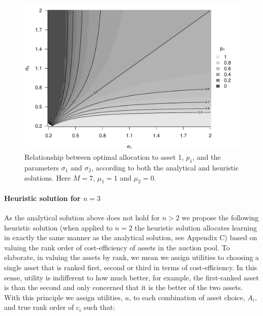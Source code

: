 \documentclass[]{article}
\theoremstyle{definition}
\theoremstyle{definition}
\theoremstyle{remark}
\begin{document}
\begin{figure}[htbp]
\centering
\includegraphics{voiConsAuc_files/figure-latex/evsi2anplot2-1.pdf}
\caption{\label{fig:evsi2anplot2}Relationship between optimal allocation to asset 1,
\(p_1\), and the parameters \(\sigma_1\) and \(\sigma_2\), according to
both the analytical and heuristic solutions. Here \(M=7\), \(\mu_1=1\)
and \(\mu_2=0\).}
\end{figure}

\clearpage

\paragraph*{\texorpdfstring{Heuristic solution for
\(n = 3\)}{Heuristic solution for n = 3}}\label{heuristic-solution-for-n-3}

As the analytical solution above does not hold for \(n > 2\) we propose
the following heuristic solution (when applied to \(n = 2\) the
heuristic solution allocates learning in exactly the same manner as the
analytical solution, see Appendix C) based on valuing the rank order of
cost-efficiency of assets in the auction pool. To elaborate, in valuing
the assets by rank, we mean we assign utilities to choosing a single
asset that is ranked first, second or third in terms of cost-efficiency.
In this sense, utility is indifferent to how much better, for example,
the first-ranked asset is than the second and only concerned that it is
the better of the two assets. With this principle we assign utilities,
\(u\), to each combination of asset choice, \(A_i\), and true rank order
of \(c_i\) such that:
\end{document}
